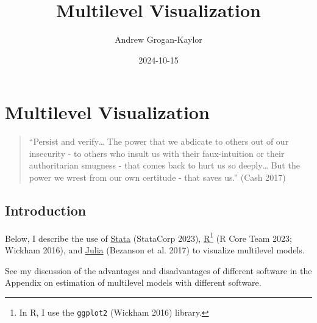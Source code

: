 \documentclass[
  letterpaper,
  DIV=11,
  numbers=noendperiod]{scrreprt}
\title{Multilevel Visualization}
\author{Andrew Grogan-Kaylor}
\date{2024-10-15}
\renewcommand*\contentsname{Table of contents}
\newcommand\contentsname{Table of contents}
\begin{document}
\maketitle

\renewcommand*\contentsname{Table of contents}
{
\hypersetup{linkcolor=}
\setcounter{tocdepth}{2}
\tableofcontents
}
\listoffigures
\listoftables


\chapter{Multilevel Visualization}\label{multilevel-visualization}

\begin{quote}
``Persist and verify\ldots{} The power that we abdicate to others out of
our insecurity - to others who insult us with their faux-intuition or
their authoritarian smugness - that comes back to hurt us so
deeply\ldots{} But the power we wrest from our own certitude - that
saves us.'' (Cash 2017)
\end{quote}

\section{Introduction}\label{introduction}

Below, I describe the use of \href{https://www.stata.com/}{Stata}
(StataCorp 2023), \href{https://www.r-project.org/}{R}\footnote{In R, I
  use the \texttt{ggplot2} (Wickham 2016) library.} (R Core Team 2023;
Wickham 2016), and \href{https://www.julialang.org/}{Julia} (Bezanson et
al. 2017) to visualize multilevel models.

\begin{tcolorbox}[enhanced jigsaw, colback=white, left=2mm, toprule=.15mm, arc=.35mm, colbacktitle=quarto-callout-tip-color!10!white, title=\textcolor{quarto-callout-tip-color}{\faLightbulb}\hspace{0.5em}{Comparison of Software}, bottomtitle=1mm, opacitybacktitle=0.6, bottomrule=.15mm, breakable, leftrule=.75mm, colframe=quarto-callout-tip-color-frame, toptitle=1mm, titlerule=0mm, coltitle=black, opacityback=0, rightrule=.15mm]

See my discussion of the advantages and disadvantages of different
software in the Appendix on estimation of multilevel models with
different software.

\end{tcolorbox}
\end{document}
